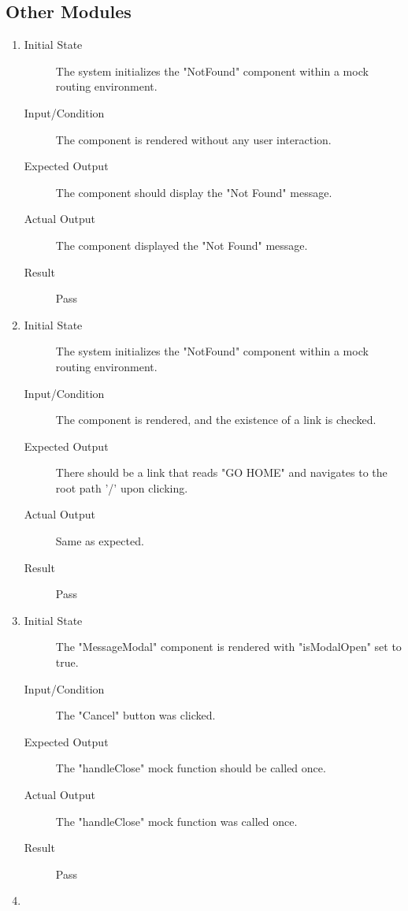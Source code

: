 \documentclass[12pt, titlepage]{article}
\begin{document}
\subsection{Other Modules}
\begin{enumerate}[UT-OT1]
  \item \label{UT-OT1}
    \begin{description}
    \item[Initial State] The system initializes the "NotFound" component within a mock routing environment.
    \item[Input/Condition] The component is rendered without any user interaction.
    \item[Expected Output] The component should display the "Not Found" message.
    \item[Actual Output] The component displayed the "Not Found" message.
    \item[Result] Pass
    \end{description}
  \item \label{UT-OT2}
    \begin{description}
    \item[Initial State] The system initializes the "NotFound" component within a mock routing environment.
    \item[Input/Condition] The component is rendered, and the existence of a link is checked.
    \item[Expected Output] There should be a link that reads "GO HOME" and navigates to the root path '/' upon clicking.
    \item[Actual Output] Same as expected.
    \item[Result] Pass
    \end{description}
  \item \label{UT-OT3}
    \begin{description}
    \item[Initial State] The "MessageModal" component is rendered with "isModalOpen" set to true.
    \item[Input/Condition]  The "Cancel" button was clicked.
    \item[Expected Output] The "handleClose" mock function should be called once.
    \item[Actual Output] The "handleClose" mock function was called once.
    \item[Result] Pass
    \end{description}
  \item \label{UT-OT4}
    \begin{description}

\end{description}
\end{enumerate}
\end{document}
